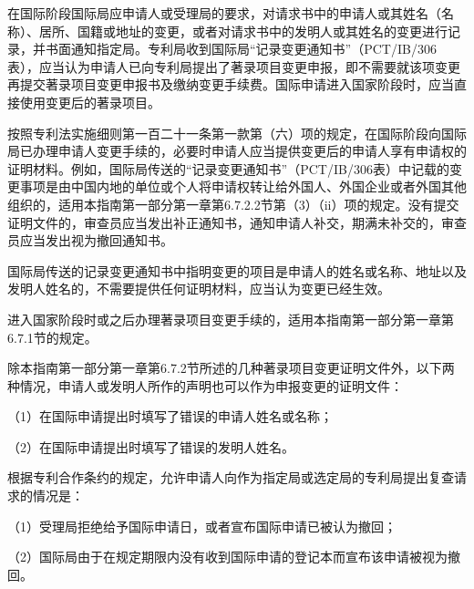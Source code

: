 在国际阶段国际局应申请人或受理局的要求，对请求书中的申请人或其姓名（名称）、居所、国籍或地址的变更，或者对请求书中的发明人或其姓名的变更进行记录，并书面通知指定局。专利局收到国际局“记录变更通知书”（PCT/IB/306表），应当认为申请人已向专利局提出了著录项目变更申报，即不需要就该项变更再提交著录项目变更申报书及缴纳变更手续费。国际申请进入国家阶段时，应当直接使用变更后的著录项目。

按照专利法实施细则第一百二十一条第一款第（六）项的规定，在国际阶段向国际局已办理申请人变更手续的，必要时申请人应当提供变更后的申请人享有申请权的证明材料。例如，国际局传送的“记录变更通知书”（PCT/IB/306表）中记载的变更事项是由中国内地的单位或个人将申请权转让给外国人、外国企业或者外国其他组织的，适用本指南第一部分第一章第6.7.2.2节第（3）（ii）项的规定。没有提交证明文件的，审查员应当发出补正通知书，通知申请人补交，期满未补交的，审查员应当发出视为撤回通知书。

国际局传送的记录变更通知书中指明变更的项目是申请人的姓名或名称、地址以及发明人姓名的，不需要提供任何证明材料，应当认为变更已经生效。

进入国家阶段时或之后办理著录项目变更手续的，适用本指南第一部分第一章第6.7.1节的规定。

除本指南第一部分第一章第6.7.2节所述的几种著录项目变更证明文件外，以下两种情况，申请人或发明人所作的声明也可以作为申报变更的证明文件：

{\setlength{\parindent}{17.8bp}（1）在国际申请提出时填写了错误的申请人姓名或名称；\par}

{\setlength{\parindent}{17.8bp}（2）在国际申请提出时填写了错误的发明人姓名。\par}

根据专利合作条约的规定，允许申请人向作为指定局或选定局的专利局提出复查请求的情况是：

{\setlength{\parindent}{17.8bp}（1）受理局拒绝给予国际申请日，或者宣布国际申请已被认为撤回；\par}

{\setlength{\parindent}{17.8bp}（2）国际局由于在规定期限内没有收到国际申请的登记本而宣布该申请被视为撤回。\par}

